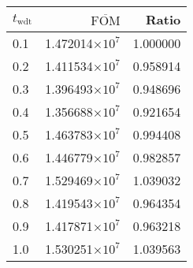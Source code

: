\begin{tabular}{lrr}
\toprule
$t_{\mathrm{wdt}}$ & $\overline{\mathrm{FOM}}$ &    Ratio \\
\midrule
               0.1 &   1.472014$\times 10^{7}$ & 1.000000 \\
               0.2 &   1.411534$\times 10^{7}$ & 0.958914 \\
               0.3 &   1.396493$\times 10^{7}$ & 0.948696 \\
               0.4 &   1.356688$\times 10^{7}$ & 0.921654 \\
               0.5 &   1.463783$\times 10^{7}$ & 0.994408 \\
               0.6 &   1.446779$\times 10^{7}$ & 0.982857 \\
               0.7 &   1.529469$\times 10^{7}$ & 1.039032 \\
               0.8 &   1.419543$\times 10^{7}$ & 0.964354 \\
               0.9 &   1.417871$\times 10^{7}$ & 0.963218 \\
               1.0 &   1.530251$\times 10^{7}$ & 1.039563 \\
\bottomrule
\end{tabular}
